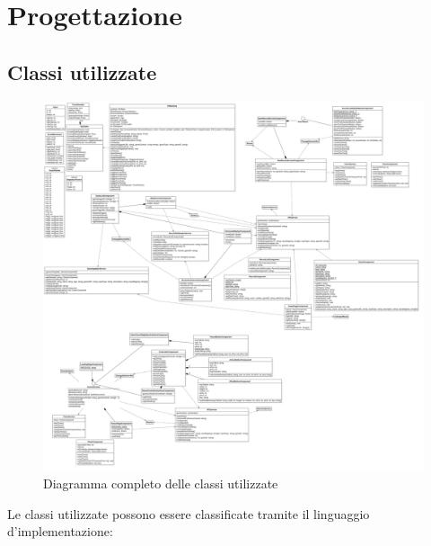 \section{Progettazione}
\label{sec:progettazione}
\subsection{Classi utilizzate}
\begin{figure}[h]
    \centering
    \includegraphics[width=340pt]{images/prog/ENGaming.png}
    \caption{Diagramma completo delle classi utilizzate}
    \label{fig:diagrammaCompleto}
\end{figure}
Le classi utilizzate possono essere classificate tramite il linguaggio d'implementazione:
